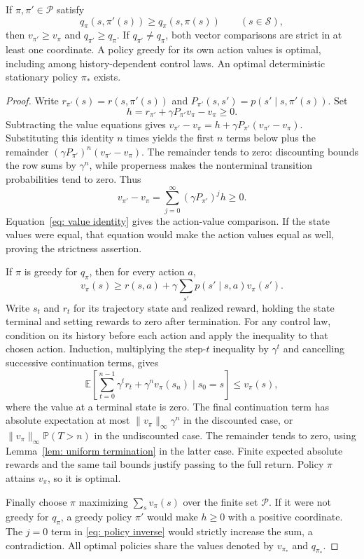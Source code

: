 \begin{lemma}\label{thm: strict PIT}
If $\pi,\pi'\in\mathcal P$ satisfy
\begin{equation}\label{eq: PIT condition}
q_\pi(s,\pi'(s))\ge q_\pi(s,\pi(s))\qquad(s\in\mathcal S),
\end{equation}
then $v_{\pi'}\ge v_\pi$ and $q_{\pi'}\ge q_\pi$. If $q_{\pi'}\ne q_\pi$, both vector comparisons are strict in at least one coordinate. A policy greedy for its own action values is optimal, including among history-dependent control laws. An optimal deterministic stationary policy $\pi_*$ exists.
\end{lemma}
\begin{proof}
Write $r_{\pi'}(s)=r(s,\pi'(s))$ and $P_{\pi'}(s,s')=p(s'\mid s,\pi'(s))$. Set
\[
h=r_{\pi'}+\gamma P_{\pi'}v_\pi-v_\pi\ge0.
\]
Subtracting the value equations gives $v_{\pi'}-v_\pi=h+\gamma P_{\pi'}(v_{\pi'}-v_\pi)$. Substituting this identity $n$ times yields the first $n$ terms below plus the remainder $(\gamma P_{\pi'})^n(v_{\pi'}-v_\pi)$. The remainder tends to zero: discounting bounds the row sums by $\gamma^n$, while properness makes the nonterminal transition probabilities tend to zero. Thus
\begin{equation}\label{eq: policy inverse}
v_{\pi'}-v_\pi=\sum_{j=0}^\infty(\gamma P_{\pi'})^j h\ge0.
\end{equation}
Equation~\eqref{eq: value identity} gives the action-value comparison. If the state values were equal, that equation would make the action values equal as well, proving the strictness assertion.

If $\pi$ is greedy for $q_\pi$, then for every action $a$,
\[
v_\pi(s)\ge r(s,a)+\gamma\sum_{s'}p(s'\mid s,a)v_\pi(s').
\]
Write $s_t$ and $r_t$ for its trajectory state and realized reward, holding the state terminal and setting rewards to zero after termination. For any control law, condition on its history before each action and apply the inequality to that chosen action. Induction, multiplying the step-$t$ inequality by $\gamma^t$ and cancelling successive continuation terms, gives
\[
\mathbb E\!\left[\sum_{t=0}^{n-1}\gamma^t r_t+\gamma^n v_\pi(s_n)\mid s_0=s\right]\le v_\pi(s),
\]
where the value at a terminal state is zero. The final continuation term has absolute expectation at most $\|v_\pi\|_\infty\gamma^n$ in the discounted case, or $\|v_\pi\|_\infty\mathbb P(T>n)$ in the undiscounted case. The remainder tends to zero, using Lemma~\ref{lem: uniform termination} in the latter case. Finite expected absolute rewards and the same tail bounds justify passing to the full return. Policy $\pi$ attains $v_\pi$, so it is optimal.

Finally choose $\pi$ maximizing $\sum_s v_\pi(s)$ over the finite set $\mathcal P$. If it were not greedy for $q_\pi$, a greedy policy $\pi'$ would make $h\ge0$ with a positive coordinate. The $j=0$ term in \eqref{eq: policy inverse} would strictly increase the sum, a contradiction. All optimal policies share the values denoted by $v_{\pi_*}$ and $q_{\pi_*}$.
\end{proof}

